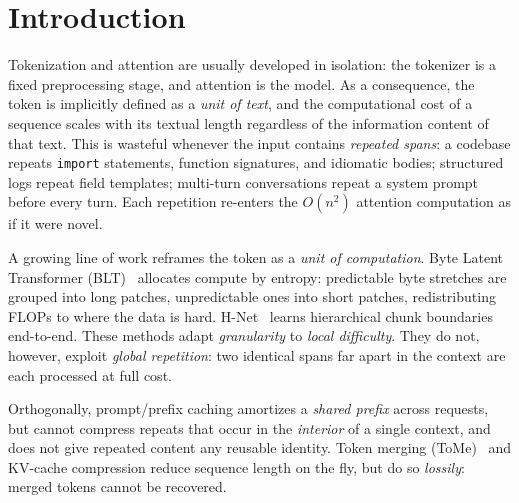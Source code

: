 \documentclass[11pt]{article}
\begin{document}
\begin{abstract}
win survives on GPU with FlashAttention: on Qwen2.5-3B (Tesla T4, SDPA/FA) prefill speedup
rises from $1.30\times$ at 512 to $1.91\times$ at 4096 tokens, because CTA shrinks the
length-linear cost (MLP/projections/head)---$70$--$98\%$ of prefill compute---which
FlashAttention does not optimize. We position CTA against ASG, R3Mem, H-Net, and Token Merging, and argue it occupies
a previously empty niche: the only \emph{reversible, session-scoped, parameter-free}
deduplication mechanism motivated by compute amortization rather than compression. We close
with an honest characterization of its applicability boundary: CTA is a clear win on
\emph{deep} redundancy (code, boilerplate) and requires aggressive gated expansion on
\emph{shallow} redundancy (structured logs) where repeated field templates immediately
precede distinguishing content.
\end{abstract}

\section{Introduction}
\label{sec:intro}

Tokenization and attention are usually developed in isolation: the tokenizer is a fixed
preprocessing stage, and attention is the model. As a consequence, the token is
implicitly defined as a \emph{unit of text}, and the computational cost of a sequence
scales with its textual length regardless of the information content of that text. This
is wasteful whenever the input contains \emph{repeated spans}: a codebase repeats
\texttt{import} statements, function signatures, and idiomatic bodies; structured logs
repeat field templates; multi-turn conversations repeat a system prompt before every
turn. Each repetition re-enters the $O(n^2)$ attention computation as if it were novel.

A growing line of work reframes the token as a \emph{unit of computation}. Byte Latent
Transformer (BLT)~\cite{blt} allocates compute by entropy: predictable byte stretches are
grouped into long patches, unpredictable ones into short patches, redistributing FLOPs to
where the data is hard. H-Net~\cite{hnet} learns hierarchical chunk boundaries end-to-end.
These methods adapt \emph{granularity} to \emph{local difficulty}. They do not, however,
exploit \emph{global repetition}: two identical spans far apart in the context are each
processed at full cost.

Orthogonally, prompt/prefix caching amortizes a \emph{shared prefix} across requests, but
cannot compress repeats that occur in the \emph{interior} of a single context, and does
not give repeated content any reusable identity. Token merging (ToMe)~\cite{tome} and
KV-cache compression reduce sequence length on the fly, but do so \emph{lossily}: merged
tokens cannot be recovered.
\end{document}
